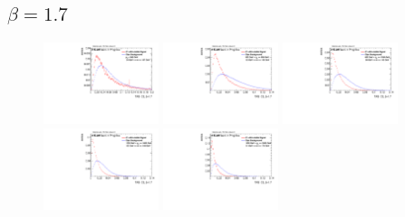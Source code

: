 \subsection*{$\beta=1.7$}
\begin{figure}
\includegraphics[width=0.3\textwidth]{sascha_input/Appendix/Distributions/higgs/distributions/beta17/h_assisted_tj_C2_17_bin1.pdf} \hspace{1mm}
\includegraphics[width=0.3\textwidth]{sascha_input/Appendix/Distributions/higgs/distributions/beta17/h_assisted_tj_C2_17_bin2.pdf} \hspace{4mm}
\includegraphics[width=0.3\textwidth]{sascha_input/Appendix/Distributions/higgs/distributions/beta17/h_assisted_tj_C2_17_bin3.pdf} 
\bigskip
\includegraphics[width=0.3\textwidth]{sascha_input/Appendix/Distributions/higgs/distributions/beta17/h_assisted_tj_C2_17_bin4.pdf} \hspace{4mm}
\includegraphics[width=0.3\textwidth]{sascha_input/Appendix/Distributions/higgs/distributions/beta17/h_assisted_tj_C2_17_bin5.pdf} 


\end{figure}
